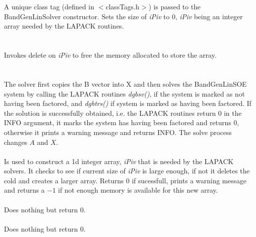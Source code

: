   \\
  \\
A unique class tag (defined in $<$classTags.h$>$) is passed to the
BandGenLinSolver constructor. Sets the size of {\em iPiv} to $0$, {\em
iPiv} being an integer array needed by the LAPACK routines. \\

 \\
\\ 
Invokes delete on {\em iPiv} to free the memory allocated to store the
array. \\ 

  \\
 \\
The solver first copies the B vector into X and then solves the
BandGenLinSOE system by calling the LAPACK routines {\em
dgbsv()}, if the system is marked as not having been factored, and {\em
dgbtrs()} if system is marked as having been factored. If the
solution is successfully obtained, i.e. the LAPACK routines return $0$
in the INFO argument, it marks the system has having been
factored and returns $0$, otherwise it prints a warning message and
returns INFO. The solve process changes $A$ and $X$. \\   

 \\
Is used to construct a 1d integer array, {\em iPiv} that is needed by
the LAPACK solvers. It checks to see if current size of {\em iPiv} is
large enough, if not it deletes the cold and creates a larger
array. Returns $0$ if sucessfull, prints a warning message and returns
a $-1$ if not enough memory is available for this new array. \\


 \\ 
Does nothing but return $0$. \\

 \\ 
Does nothing but return $0$. \\
